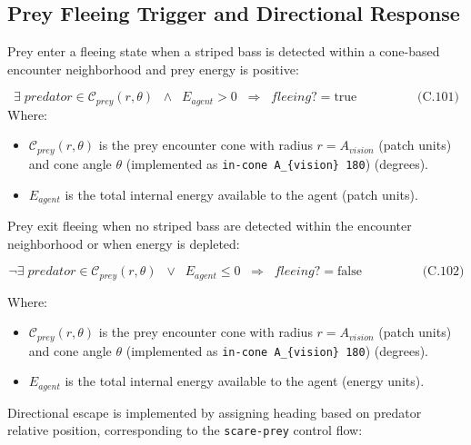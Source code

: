 \documentclass[
]{book}
\providecommand{\tightlist}{%
  \setlength{\itemsep}{0pt}\setlength{\parskip}{0pt}}
\begin{document}
\subsection{Prey Fleeing Trigger and Directional Response}\label{prey-fleeing-trigger-and-directional-response}

Prey enter a fleeing state when a striped bass is detected within a
cone-based encounter neighborhood and prey energy is positive:

\[
\begin{equation} \exists \; predator \in \mathcal{C}_{prey}(r,\theta)\;\; \land \;\; E_{agent} > 0 \;\;\Rightarrow\;\; fleeing? = \text{true}  \hspace{2cm} \text{(C.101)} \end{equation}
\] Where:

\begin{itemize}
\tightlist
\item
  \(\mathcal{C}_{prey}(r,\theta)\) is the prey encounter cone with
  radius \(r = A_{vision}\) (patch units) and cone angle \(\theta\)
  (implemented as \texttt{in-cone\ A\_\{vision\}\ 180}) (degrees).
\item
  \(E_{agent}\) is the total internal energy available to the agent
  (patch units).
\end{itemize}

Prey exit fleeing when no striped bass are detected within the encounter
neighborhood or when energy is depleted:

\[
\begin{equation} \neg \exists \; predator \in \mathcal{C}_{prey}(r,\theta)\;\; \lor \;\; E_{agent} \le 0 \;\;\Rightarrow\;\; fleeing? = \text{false}  \hspace{2cm} \text{(C.102)} \end{equation}
\]

Where:

\begin{itemize}
\tightlist
\item
  \(\mathcal{C}_{prey}(r,\theta)\) is the prey encounter cone with
  radius \(r = A_{vision}\) (patch units) and cone angle \(\theta\)
  (implemented as \texttt{in-cone\ A\_\{vision\}\ 180}) (degrees).
\item
  \(E_{agent}\) is the total internal energy available to the agent
  (energy units).
\end{itemize}

Directional escape is implemented by assigning heading based on predator
relative position, corresponding to the \texttt{scare-prey} control flow:
\end{document}
